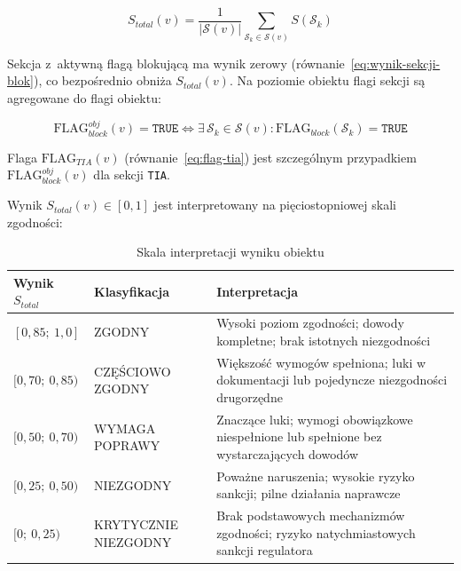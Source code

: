 \begin{equation}
S_{total}(v) =
\frac{1}{|\mathcal{S}(v)|}
\sum_{\mathcal{S}_k \in \mathcal{S}(v)}
S(\mathcal{S}_k)
\label{eq:wynik-obiektu}
\end{equation}

Sekcja z~aktywną flagą blokującą ma wynik zerowy
(równanie~\eqref{eq:wynik-sekcji-blok}), co bezpośrednio
obniża $S_{total}(v)$. Na poziomie obiektu flagi sekcji
są agregowane do flagi obiektu:

\begin{equation}
\text{FLAG}_{block}^{obj}(v) = \texttt{TRUE}
\iff
\exists\, \mathcal{S}_k \in \mathcal{S}(v) :
\text{FLAG}_{block}(\mathcal{S}_k) = \texttt{TRUE}
\label{eq:flag-block-obj}
\end{equation}

\noindent Flaga $\text{FLAG}_{TIA}(v)$ (równanie~\eqref{eq:flag-tia})
jest szczególnym przypadkiem $\text{FLAG}_{block}^{obj}(v)$
dla sekcji \texttt{TIA}.

\noindent Wynik $S_{total}(v) \in [0, 1]$ jest
interpretowany na pięciostopniowej skali zgodności:

\begin{table}[H]
\centering
\caption{Skala interpretacji wyniku obiektu}
\label{tab:skala-wyniku}
\renewcommand{\arraystretch}{1.4}
\begin{tabular}{p{3cm}p{3cm}p{7cm}}
\toprule
\textbf{Wynik $S_{total}$} & \textbf{Klasyfikacja}
& \textbf{Interpretacja} \\
\midrule
$[0{,}85;\ 1{,}0]$   & \textsc{ZGODNY}
& Wysoki poziom zgodności; dowody kompletne;
  brak istotnych niezgodności \\
\midrule
$[0{,}70;\ 0{,}85)$  & \textsc{CZĘŚCIOWO ZGODNY}
& Większość wymogów spełniona; luki w dokumentacji
  lub pojedyncze niezgodności drugorzędne \\
\midrule
$[0{,}50;\ 0{,}70)$  & \textsc{WYMAGA POPRAWY}
& Znaczące luki; wymogi obowiązkowe niespełnione
  lub spełnione bez wystarczających dowodów \\
\midrule
$[0{,}25;\ 0{,}50)$  & \textsc{NIEZGODNY}
& Poważne naruszenia; wysokie ryzyko sankcji;
  pilne działania naprawcze \\
\midrule
$[0;\ 0{,}25)$        & \textsc{KRYTYCZNIE NIEZGODNY}
& Brak podstawowych mechanizmów zgodności;
  ryzyko natychmiastowych sankcji regulatora \\
\bottomrule
\end{tabular}
\end{table}

